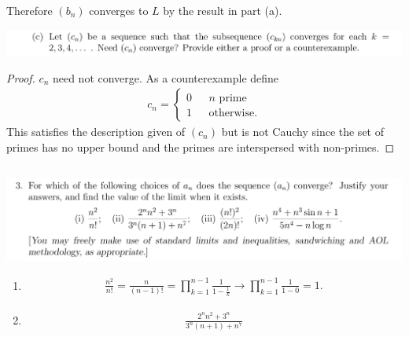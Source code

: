 \documentclass[12pt]{article}
\begin{document}
Therefore $(b_n)$ converges to $L$ by the result in part (a).

\begin{mdframed}
\includegraphics[width=400pt]{img/oxford-M2-analysis-I-4-2-c.png}
\end{mdframed}

\begin{proof}
  $c_n$ need not converge. As a counterexample define
  \begin{align*}
    c_n =
    \begin{cases}
      0 ~~~~~~~\text{$n$ prime}\\
      1 ~~~~~~~\text{otherwise}.
    \end{cases}
  \end{align*}
  This satisfies the description given of $(c_n)$ but is not Cauchy since the set of primes has no
  upper bound and the primes are interspersed with non-primes.
\end{proof}

\newpage
\subsection{}
\begin{mdframed}
\includegraphics[width=400pt]{img/oxford-M2-analysis-I-4-3.png}
\end{mdframed}

\begin{enumerate}[label=(\roman*)]
\item
  \begin{align*}
    \frac{n^2}{n!} = \frac{n}{(n-1)!}
                   = \prod_{k=1}^{n - 1} \frac{1}{1 - \frac{1}{k}}
                   \to \prod_{k=1}^{n - 1} \frac{1}{1 - 0}
                   = 1.
  \end{align*}
\item
  \begin{align*}
    \frac{2^nn^2 + 3^n}{3^n(n + 1) + n^7}
  \end{align*}
\end{enumerate}
\end{document}
